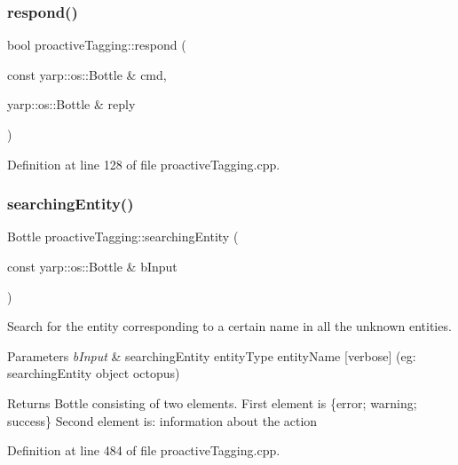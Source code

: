 \subsubsection{\texorpdfstring{respond()}{respond()}}
{\footnotesize\ttfamily bool proactive\+Tagging\+::respond (\begin{DoxyParamCaption}\item[{const yarp\+::os\+::\+Bottle \&}]{cmd,  }\item[{yarp\+::os\+::\+Bottle \&}]{reply }\end{DoxyParamCaption})}



Definition at line 128 of file proactive\+Tagging.\+cpp.

\mbox{\label{classproactiveTagging_a06f3da8e08290cc4e667dc1f1ab0a2ba}} 
\subsubsection{\texorpdfstring{searching\+Entity()}{searchingEntity()}}
{\footnotesize\ttfamily Bottle proactive\+Tagging\+::searching\+Entity (\begin{DoxyParamCaption}\item[{const yarp\+::os\+::\+Bottle \&}]{b\+Input }\end{DoxyParamCaption})}



Search for the entity corresponding to a certain name in all the unknown entities. 


\begin{DoxyParams}{Parameters}
{\em b\+Input} & searching\+Entity entity\+Type entity\+Name \mbox{[}verbose\mbox{]} (eg\+: searching\+Entity object octopus) \\
\hline
\end{DoxyParams}
\begin{DoxyReturn}{Returns}
Bottle consisting of two elements. First element is \{error; warning; success\} Second element is\+: information about the action 
\end{DoxyReturn}


Definition at line 484 of file proactive\+Tagging.\+cpp.

\mbox{\label{classproactiveTagging_a277e15d7575cbd390dac6acd248a0efe}} 
